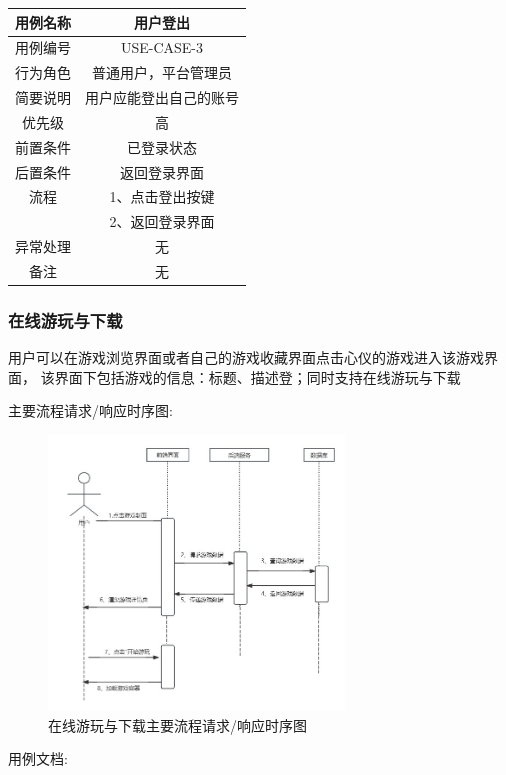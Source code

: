 \documentclass[12pt]{ctexart} %
\begin{document}
\begin{tabular}{|c|c|}
  \hline
  用例名称& 用户登出\\
  \hline
  用例编号 & USE-CASE-3\\
  \hline
  行为角色 & 普通用户，平台管理员\\
  \hline
  简要说明 & 用户应能登出自己的账号\\
  \hline
  优先级 & 高\\
  \hline
  前置条件 & 已登录状态\\
  \hline
  后置条件 & 返回登录界面\\
  \hline
  流程 & 1、点击登出按键\\
      & 2、返回登录界面\\
  \hline
  异常处理 & 无\\
  \hline
  备注 & 无\\
  \hline
\end{tabular}

\subsubsection{在线游玩与下载}
用户可以在游戏浏览界面或者自己的游戏收藏界面点击心仪的游戏进入该游戏界面，
该界面下包括游戏的信息：标题、描述登；同时支持在线游玩与下载

主要流程请求/响应时序图:
\begin{figure}[ht]
  \centering
  \includegraphics[width=0.7\textwidth]{yongli4.jpg}
  \caption{在线游玩与下载主要流程请求/响应时序图}
\end{figure}
用例文档:
\end{document}

